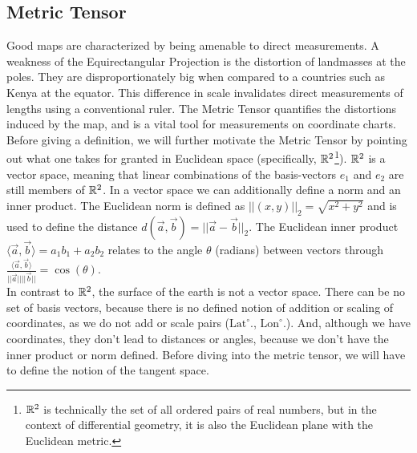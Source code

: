 \subsection*{Metric Tensor}
Good maps are characterized by being amenable to direct measurements. A weakness of the Equirectangular Projection is the distortion of landmasses at the poles. They are disproportionately big when compared to a countries such as Kenya at the equator. This difference in scale invalidates direct measurements of lengths using a conventional ruler. The Metric Tensor quantifies the distortions induced by the map, and is a vital tool for measurements on coordinate charts.
Before giving a definition, we will further motivate the Metric Tensor by pointing out what one takes for granted in Euclidean space (specifically, $\mathbb{R}^2$\footnote{$\mathbb{R}^2$ is technically the set of all ordered pairs of real numbers, but in the context of differential geometry, it is also the Euclidean plane with the Euclidean metric.}). $\mathbb{R}^2$ is a vector space, meaning that linear combinations of the basis-vectors $e_1$ and $e_2$ are still members of $\mathbb{R}^2$. In a vector space we can additionally define a norm and an inner product. The Euclidean norm is defined as $||(x,y)||_2 = \sqrt{x^2 + y^2}$ and is used to define the distance $d(\vec{a}, \vec{b}) = ||\vec{a}-\vec{b}||_2$. The Euclidean inner product $\langle \vec{a},\vec{b} \rangle = a_1b_1 +a_2b_2$ relates to the angle $\theta$ (radians) between vectors through $\frac{\langle \vec{a},\vec{b} \rangle}{||\vec{a}||||\vec{b}||} = \cos(\theta)$.
\\
In contrast to $\mathbb{R}^2$, the surface of the earth is not a vector space. There can be no set of basis vectors, because there is no defined notion of addition or scaling of coordinates, as we do not add or scale pairs ($\text{Lat}^\circ$., $\text{Lon}^\circ$.). And, although we have coordinates, they don't lead to distances or angles, because we don't have the inner product or norm defined. Before diving into the metric tensor, we will have to define the notion of the tangent space.

